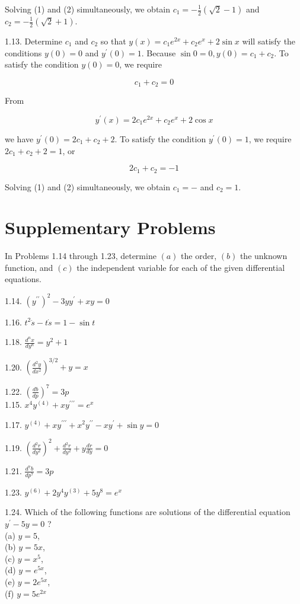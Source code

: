 \documentclass[10pt]{article}
\begin{document}
Solving (1) and (2) simultaneously, we obtain $c_{1}=-\frac{1}{2}(\sqrt{2}-1)$ and $c_{2}=-\frac{1}{2}(\sqrt{2}+1)$.

1.13. Determine $c_{1}$ and $c_{2}$ so that $y(x)=c_{1} e^{2 x}+c_{2} e^{x}+2 \sin x$ will satisfy the conditions $y(0)=0$ and $y^{\prime}(0)=1$. Because $\sin 0=0, y(0)=c_{1}+c_{2}$. To satisfy the condition $y(0)=0$, we require


\begin{equation*}
c_{1}+c_{2}=0 \tag{1}
\end{equation*}


From

$$
y^{\prime}(x)=2 c_{1} e^{2 x}+c_{2} e^{x}+2 \cos x
$$

we have $y^{\prime}(0)=2 c_{1}+c_{2}+2$. To satisfy the condition $y^{\prime}(0)=1$, we require $2 c_{1}+c_{2}+2=1$, or


\begin{equation*}
2 c_{1}+c_{2}=-1 \tag{2}
\end{equation*}


Solving (1) and (2) simultaneously, we obtain $c_{1}=-$ and $c_{2}=1$.

\section*{Supplementary Problems}
In Problems 1.14 through 1.23, determine $(a)$ the order, $(b)$ the unknown function, and $(c)$ the independent variable for each of the given differential equations.

1.14. $\left(y^{\prime \prime}\right)^{2}-3 y y^{\prime}+x y=0$

1.16. $t^{2} \ddot{s}-t \dot{s}=1-\sin t$

1.18. $\frac{d^{n} x}{d y^{n}}=y^{2}+1$

1.20. $\left(\frac{d^{2} y}{d x^{2}}\right)^{3 / 2}+y=x$

1.22. $\left(\frac{d b}{d p}\right)^{7}=3 p$\\
1.15. $x^{4} y^{(4)}+x y^{\prime \prime \prime}=e^{x}$

1.17. $y^{(4)}+x y^{\prime \prime \prime}+x^{2} y^{\prime \prime}-x y^{\prime}+\sin y=0$

1.19. $\left(\frac{d^{2} r}{d y^{2}}\right)^{2}+\frac{d^{2} r}{d y^{2}}+y \frac{d r}{d y}=0$

1.21. $\frac{d^{7} b}{d p^{7}}=3 p$

1.23. $y^{(6)}+2 y^{4} y^{(3)}+5 y^{8}=e^{x}$

1.24. Which of the following functions are solutions of the differential equation $y^{\prime}-5 y=0$ ?\\
(a) $y=5$,\\
(b) $y=5 x$,\\
(c) $y=x^{5}$,\\
(d) $y=e^{5 x}$,\\
(e) $y=2 e^{5 x}$,\\
(f) $y=5 e^{2 x}$
\end{document}
